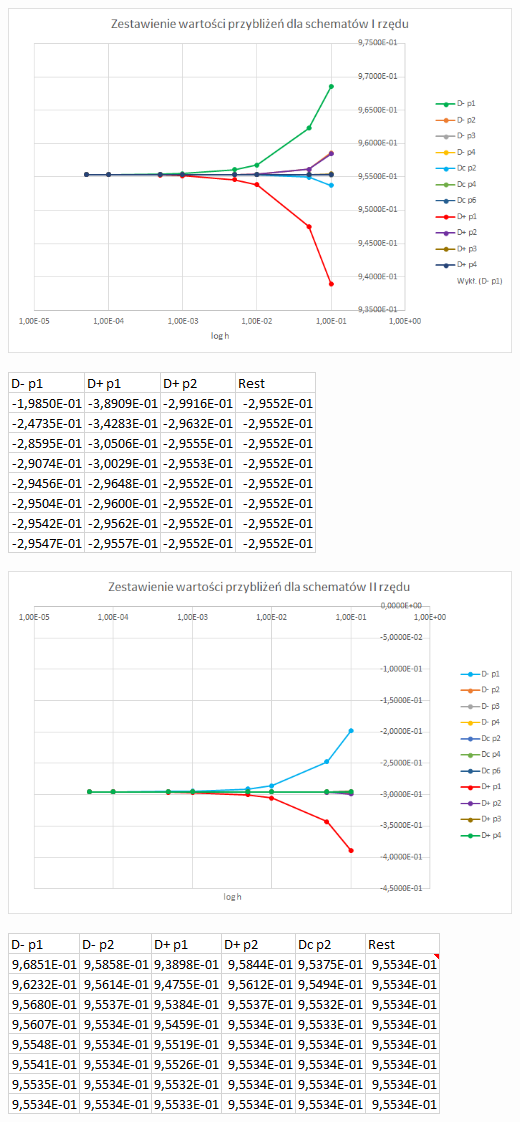 \includegraphics{Lab2/charts/rz1_log_e.png}
\newpage


\includegraphics{Lab2/charts/rz2_log_e_dane.png}

\includegraphics{Lab2/charts/rz2_log_e.png}
\newpage


\includegraphics{Lab2/charts/rz1_e_dane.png}

